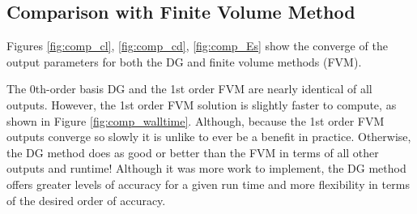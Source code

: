 \documentclass{article}
\begin{document}
\subsection{Comparison with Finite Volume Method}
Figures \ref{fig:comp_cl}, \ref{fig:comp_cd}, \ref{fig:comp_Es} show the converge of the output parameters for both the DG and finite volume methods (FVM).

The 0th-order basis DG and the 1st order FVM are nearly identical of all outputs.
However, the  1st order FVM solution is slightly faster to compute, as shown in Figure \ref{fig:comp_walltime}.
Although, because the 1st order FVM outputs converge so slowly it is unlike to ever be a benefit in practice.
Otherwise, the DG method does as good or better than the FVM in terms of all other outputs and runtime!
Although it was more work to implement, the DG method offers greater levels of accuracy for a given run time and  more flexibility in terms of the desired order of accuracy.
\end{document}
